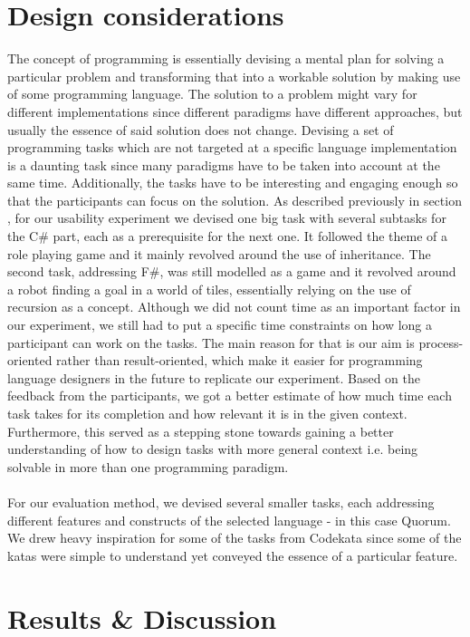 
\chapter{Design considerations}
The concept of programming is essentially devising a mental plan for solving a particular problem and transforming that into a workable solution by making use of some programming language. The solution to a problem might vary for different implementations since different paradigms have different approaches, but usually the essence of said solution does not change. Devising a set of programming tasks which are not targeted at a specific language implementation is a daunting task since many paradigms have to be taken into account at the same time. Additionally, the tasks have to be interesting and engaging enough so that the participants can focus on the solution. As described previously in section , for our usability experiment we devised one big task with several subtasks for the C\# part, each as a prerequisite for the next one. It followed the theme of a role playing game and it mainly revolved around the use of inheritance. The second task, addressing F\#, was still modelled as a game and it revolved around a robot finding a goal in a world of tiles, essentially relying on the use of recursion as a concept. Although we did not count time as an important factor in our experiment, we still had to put a specific time constraints on how long a participant can work on the tasks. The main reason for that is our aim is process-oriented rather than result-oriented, which make it easier for programming language designers in the future to replicate our experiment. Based on the feedback from the participants, we got a better estimate of how much time each task takes for its completion and how relevant it is in the given context. Furthermore, this served as a stepping stone towards gaining a better understanding of how to design tasks with more general context i.e. being solvable in more than one programming paradigm. 
\\\\For our evaluation method, we devised several smaller tasks, each addressing different features and constructs of the selected language - in this case Quorum. We drew heavy inspiration for some of the tasks from Codekata \cite{Codekata} since some of the katas were simple to understand yet conveyed the essence of a particular feature. 

\chapter{Results \& Discussion}